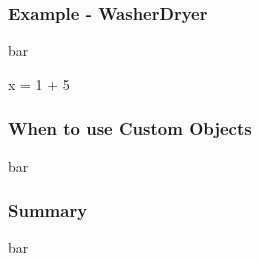 \documentclass{beamer}
\begin{document}
\begin{frame}[fragile]
\frametitle{Example - WasherDryer}
bar
\begin{code}
x = 1 + 5
\end{code}

\end{frame}

\begin{frame}[fragile]
\frametitle{When to use Custom Objects}
bar


\end{frame}

\begin{frame}[fragile]
\frametitle{Summary}
bar


\end{frame}
\end{document}
